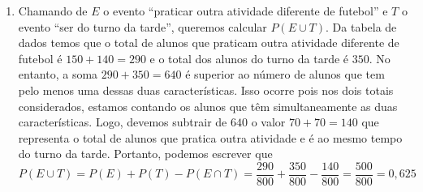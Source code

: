 \documentclass[10 pt,usenames,dvipsnames, oneside]{article}
\begin{document}
\begin{solucao}
\begin{enumerate}
\item Chamando de $E$ o evento “praticar outra atividade diferente de futebol”{} e $T$ o evento “ser do turno da tarde”, queremos calcular $P(E\cup T)$. Da tabela de dados temos que o total de alunos que praticam outra atividade diferente de futebol é $150+140=290$ e o total dos alunos do turno da tarde é $350$. No entanto, a soma $290+350=640$ é superior ao número de alunos que tem pelo menos uma dessas duas características. Isso ocorre pois nos dois totais considerados, estamos contando os alunos que têm simultaneamente as duas características. Logo, devemos subtrair de $640$ o valor $70+70=140$ que representa o total de alunos que pratica outra atividade e é ao mesmo tempo do turno da tarde. Portanto, podemos escrever que
\begin{equation*}
P(E\cup T)=P(E)+P(T)-P(E\cap T)=\frac{290}{800}+\frac{350}{800}-\frac{140}{800}=\frac{500}{800}=0{,}625
\end{equation*}
\end{enumerate}

\end{solucao}
\fi
\end{document}
